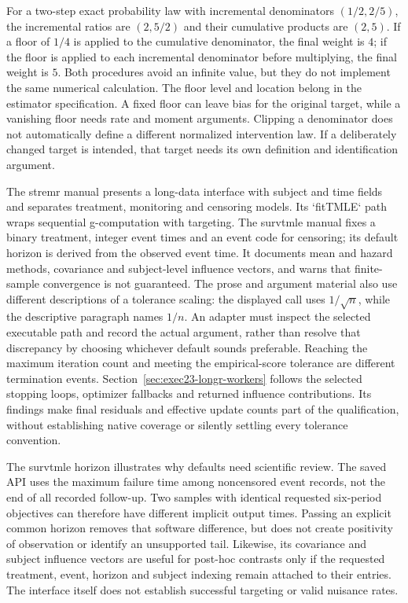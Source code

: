 For a two-step exact probability law with incremental denominators
$(1/2,2/5)$, the incremental ratios are $(2,5/2)$ and their cumulative
products are $(2,5)$. If a floor of $1/4$ is applied to the cumulative
denominator, the final weight is $4$; if the floor is applied to each
incremental denominator before multiplying, the final weight is $5$. Both
procedures avoid an infinite value, but they do not implement the same
numerical calculation. The floor level and location belong in the estimator
specification. A fixed floor can leave bias for the original target, while
a vanishing floor needs rate and moment arguments. Clipping a denominator
does not automatically define a different normalized intervention law.
If a deliberately changed target is intended, that target needs its own
definition and identification argument.~\citep{exec17_s5_math}

The stremr manual presents a long-data interface with subject and time fields
and separates treatment, monitoring and censoring models. Its `fitTMLE` path
wraps sequential g-computation with targeting. The survtmle manual fixes a
binary treatment, integer event times and an event code for censoring; its
default horizon is derived from the observed event time. It documents mean and
hazard methods, covariance and subject-level influence vectors, and warns that
finite-sample convergence is not guaranteed. The prose and argument material
also use different descriptions of a tolerance scaling: the displayed call
uses $1/\sqrt n$, while the descriptive paragraph names $1/n$.
An adapter must inspect the selected executable path and record the actual
argument, rather than resolve that discrepancy by choosing whichever
default sounds preferable. Reaching the maximum iteration count and meeting
the empirical-score tolerance are different termination events.
Section~\ref{sec:exec23-longr-workers} follows the selected stopping loops,
optimizer fallbacks and returned influence contributions. Its findings make
final residuals and effective update counts part of the qualification, without
establishing native coverage or silently settling every tolerance convention.
\citep{v12_sw_stremr,v12_sw_survtmle}

The survtmle horizon illustrates why defaults need scientific review.
The saved API uses the maximum failure time among noncensored event records,
not the end of all recorded follow-up. Two samples with identical requested
six-period objectives can therefore have different implicit output times.
Passing an explicit common horizon removes that software difference, but
does not create positivity of observation or identify an unsupported tail.
Likewise, its covariance and subject influence vectors are useful for
post-hoc contrasts only if the requested treatment, event, horizon and
subject indexing remain attached to their entries. The interface itself
does not establish successful targeting or valid nuisance rates.


